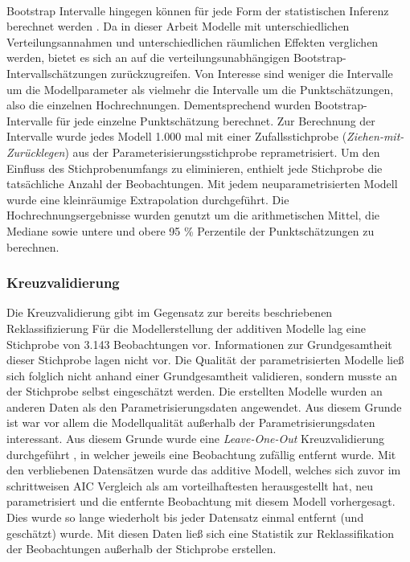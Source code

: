 \documentclass{Vorlage}
\begin{document}
\\Bootstrap Intervalle hingegen können für jede Form der statistischen Inferenz berechnet werden \cite{diciccio1996}. Da in dieser Arbeit Modelle mit unterschiedlichen Verteilungsannahmen und unterschiedlichen räumlichen Effekten verglichen werden, bietet es sich an auf die verteilungsunabhängigen Bootstrap-Intervallschätzungen zurückzugreifen. Von Interesse sind weniger die Intervalle um die Modellparameter als vielmehr die Intervalle um die Punktschätzungen, also die einzelnen Hochrechnungen. Dementsprechend wurden Bootstrap-Intervalle für jede einzelne Punktschätzung berechnet. Zur Berechnung der Intervalle wurde jedes Modell 1.000 mal mit einer Zufallsstichprobe (\textit{Ziehen-mit-Zurücklegen}) aus der Parameterisierungsstichprobe reprametrisiert. Um den Einfluss des Stichprobenumfangs zu eliminieren, enthielt jede Stichprobe die tatsächliche Anzahl der Beobachtungen. Mit jedem neuparametrisierten Modell wurde eine kleinräumige Extrapolation durchgeführt. Die Hochrechnungsergebnisse wurden genutzt um die arithmetischen Mittel, die Mediane sowie untere und obere 95 \% Perzentile der Punktschätzungen zu berechnen.

\subsubsection{Kreuzvalidierung}
Die Kreuzvalidierung gibt im Gegensatz zur bereits beschriebenen Reklassifizierung 
Für die Modellerstellung der additiven Modelle lag eine Stichprobe von 3.143 Beobachtungen vor. Informationen zur Grundgesamtheit dieser Stichprobe lagen nicht vor. Die Qualität der parametrisierten Modelle ließ sich folglich nicht anhand einer Grundgesamtheit validieren, sondern musste an der Stichprobe selbst eingeschätzt werden. Die erstellten Modelle wurden an anderen Daten als den Parametrisierungsdaten angewendet. Aus diesem Grunde ist war vor allem die Modellqualität außerhalb der Parametrisierungsdaten interessant. Aus diesem Grunde wurde eine \textit{Leave-One-Out} Kreuzvalidierung durchgeführt \cite[p. 149]{fahrmeir2013regression}, in welcher jeweils eine Beobachtung zufällig entfernt wurde. Mit den verbliebenen Datensätzen wurde das additive Modell, welches sich zuvor im schrittweisen AIC Vergleich als am vorteilhaftesten herausgestellt hat, neu parametrisiert und die entfernte Beobachtung mit diesem Modell vorhergesagt. Dies wurde so lange wiederholt bis jeder Datensatz einmal entfernt (und geschätzt) wurde. Mit diesen Daten ließ sich eine Statistik zur Reklassifikation der Beobachtungen außerhalb der Stichprobe erstellen.
\end{document}
